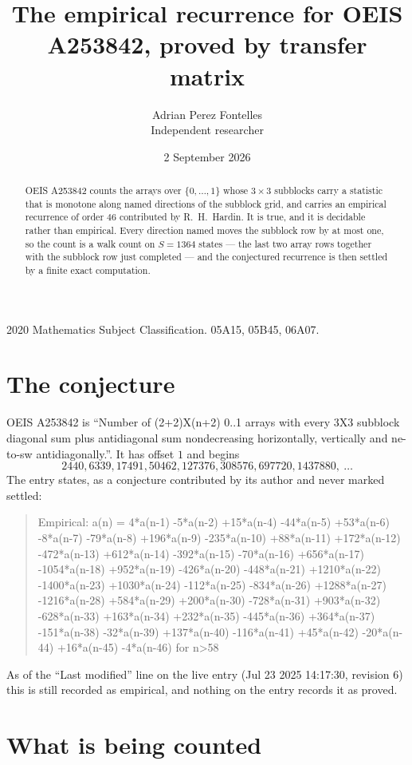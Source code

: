 \documentclass[11pt,a4paper]{article}
\title{The empirical recurrence for OEIS A253842, proved by transfer matrix}
\author{Adrian Perez Fontelles\\ \small Independent researcher}
\date{2 September 2026}
\theoremstyle{plain}
\theoremstyle{definition}
\begin{document}
\maketitle

\begin{abstract}
OEIS A253842 counts the arrays over $\{0,\dots,1\}$ whose $3\times3$ subblocks carry a
statistic that is monotone along named directions of the subblock grid, and carries an
empirical recurrence of order $46$ contributed by R.~H.~Hardin. It is true, and it is
decidable rather than empirical. Every direction named moves the subblock row by at most one,
so the count is a walk count on $S=1364$ states --- the last two array rows together with the
subblock row just completed --- and the conjectured recurrence is then settled by a finite
exact computation.
\end{abstract}

\noindent\small 2020 Mathematics Subject Classification. 05A15, 05B45, 06A07.\normalsize

\section{The conjecture}

OEIS A253842 is ``Number of (2+2)X(n+2) 0..1 arrays with every 3X3 subblock diagonal sum plus antidiagonal sum nondecreasing horizontally, vertically and ne-to-sw antidiagonally.''. It has offset $1$ and begins
\[
2440, 6339, 17491, 50462, 127376, 308576, 697720, 1437880,\ \dots
\]
The entry states, as a conjecture contributed by its author and never marked settled:
\begin{quote}
Empirical: a(n) = 4*a(n-1) -5*a(n-2) +15*a(n-4) -44*a(n-5) +53*a(n-6) -8*a(n-7) -79*a(n-8) +196*a(n-9) -235*a(n-10) +88*a(n-11) +172*a(n-12) -472*a(n-13) +612*a(n-14) -392*a(n-15) -70*a(n-16) +656*a(n-17) -1054*a(n-18) +952*a(n-19) -426*a(n-20) -448*a(n-21) +1210*a(n-22) -1400*a(n-23) +1030*a(n-24) -112*a(n-25) -834*a(n-26) +1288*a(n-27) -1216*a(n-28) +584*a(n-29) +200*a(n-30) -728*a(n-31) +903*a(n-32) -628*a(n-33) +163*a(n-34) +232*a(n-35) -445*a(n-36) +364*a(n-37) -151*a(n-38) -32*a(n-39) +137*a(n-40) -116*a(n-41) +45*a(n-42) -20*a(n-44) +16*a(n-45) -4*a(n-46) for n>58
\end{quote}
As of the ``Last modified'' line on the live entry (Jul 23 2025 14:17:30, revision 6) this is still
recorded as empirical, and nothing on the entry records it as proved.

\section{What is being counted}
\end{document}
